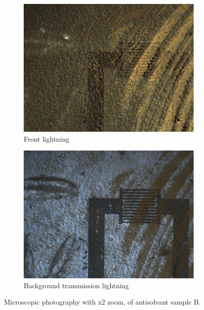\begin{figure}
    \centering
\begin{subfigure}{.4\textwidth}
    \centering
    \includegraphics[width=\textwidth]{Data/SampleB_2xzoom.jpg}
    \caption{Front lightning}
\end{subfigure}
\begin{subfigure}{.4\textwidth}
    \centering
    \includegraphics[width=\textwidth]{Data/SampleB_x2zoom_transmission.jpg}
    \caption{Background transmission lightning}
\end{subfigure}
\caption{Microscopic photography with x2 zoom, of antisolvant sample B.}\label{fig:optic-B}
\end{figure}

